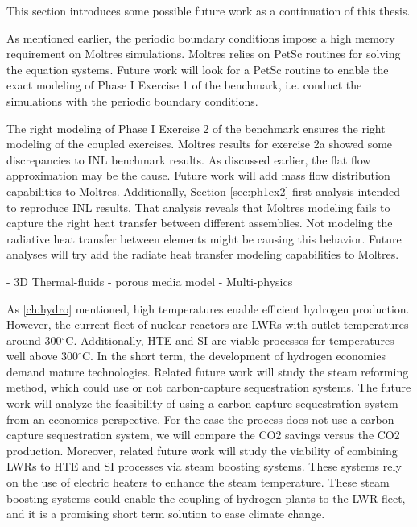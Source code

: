 This section introduces some possible future work as a continuation of this thesis.

As mentioned earlier, the periodic boundary conditions impose a high memory requirement on Moltres simulations.
Moltres relies on PetSc routines for solving the equation systems.
Future work will look for a PetSc routine to enable the exact modeling of Phase I Exercise 1 of the benchmark, i.e. conduct the simulations with the periodic boundary conditions.

The right modeling of Phase I Exercise 2 of the benchmark ensures the right modeling of the coupled exercises.
Moltres results for exercise 2a showed some discrepancies to INL benchmark results.
As discussed earlier, the flat flow approximation may be the cause.
Future work will add mass flow distribution capabilities to Moltres.
Additionally, Section \ref{sec:ph1ex2} first analysis intended to reproduce INL results.
That analysis reveals that Moltres modeling fails to capture the right heat transfer between different assemblies.
Not modeling the radiative heat transfer between elements might be causing this behavior.
Future analyses will try add the radiate heat transfer modeling capabilities to Moltres.


- 3D Thermal-fluids
	- porous media model
	- Multi-physics


As \ref{ch:hydro} mentioned, high temperatures enable efficient hydrogen production.
However, the current fleet of nuclear reactors are LWRs with outlet temperatures around 300$^{\circ}$C.
Additionally, HTE and SI are viable processes for temperatures well above 300$^{\circ}$C.
In the short term, the development of hydrogen economies demand mature technologies.
Related future work will study the steam reforming method, which could use or not carbon-capture sequestration systems.
The future work will analyze the feasibility of using a carbon-capture sequestration system from an economics perspective.
For the case the process does not use a carbon-capture sequestration system, we will compare the \gls{CO2} savings versus the \gls{CO2} production.
Moreover, related future work will study the viability of combining LWRs to HTE and SI processes via steam boosting systems.
These systems rely on the use of electric heaters to enhance the steam temperature.
These steam boosting systems could enable the coupling of hydrogen plants to the LWR fleet, and it is a promising short term solution to ease climate change.
